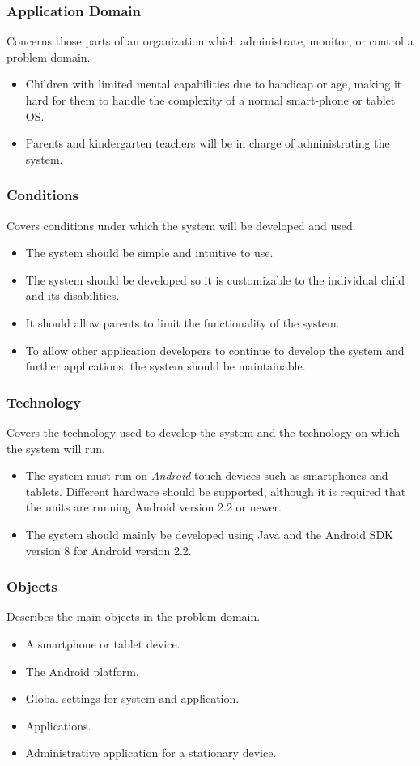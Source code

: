 \subsubsection*{Application Domain} 
Concerns those parts of an organization which administrate, monitor, or control a
problem domain.
\begin{itemize}
	\item Children with limited mental capabilities due to handicap or age, making it hard for them to handle the complexity of a normal smart-phone or tablet OS. 
	\item Parents and kindergarten teachers will be in charge of administrating the system.
\end{itemize}

\subsubsection*{Conditions} 
Covers conditions under which the system will be developed and used.
\begin{itemize}
	\item The system should be simple and intuitive to use. 
	\item The system should be developed so it is customizable to the individual child and its disabilities.
	\item It should allow parents to limit the functionality of the system. 
	\item To allow other application developers to continue to develop the system and further applications, the system should be maintainable.
\end{itemize}

\subsubsection*{Technology} 
Covers the technology used to develop the system and the technology on which the system will run.
\begin{itemize}
	\item The system must run on \emph{Android} touch devices such as smartphones and tablets. Different hardware should be supported, although it is required that the units are running Android version 2.2 or newer. 
	\item The system should mainly be developed using Java and the Android SDK version 8 for Android version 2.2.
\end{itemize}

\subsubsection*{Objects} 
Describes the main objects in the problem domain.
\begin{itemize}
	\item A smartphone or tablet device. 
	\item The Android platform. 
	\item Global settings for system and application.
	\item Applications.
	\item Administrative application for a stationary device.
\end{itemize}


